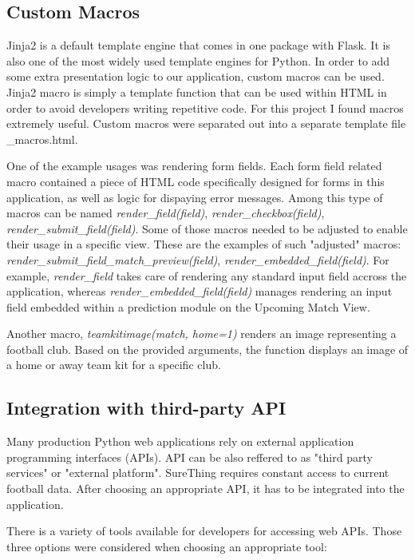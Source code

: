 \subsection{Custom Macros}
Jinja2 is a default template engine that comes in one package with Flask. It is also one of the most widely used template engines for Python. In order to add some extra presentation logic to our application, custom macros can be used. Jinja2 macro is simply a template function that can be used within HTML in order to avoid developers writing repetitive code. For this project I found macros extremely useful. Custom macros were separated out into a separate template file \_macros.html.

One of the example usages was rendering form fields. Each form field related macro contained a piece of HTML code specifically designed for forms in this application, as well as logic for dispaying error messages. Among this type of macros can be named \emph{render\_field(field)}, \emph{render\_checkbox(field)}, \emph{render\_submit\_field(field)}. Some of those macros needed to be adjusted to enable their usage in a specific view. These are the examples of such "adjusted" macros: \emph{render\_submit\_field\_match\_preview(field)}, \emph{render\_embedded\_field(field)}. For example, \emph{render\_field} takes care of rendering any standard input field accross the application, whereas \emph{render\_embedded\_field(field)} manages rendering an input field embedded within a prediction module on the Upcoming Match View. 

Another macro, \emph{teamkitimage(match, home=1)} renders an image representing a football club. Based on the provided arguments, the function displays an image of a home or away team kit for a specific club. 

\subsection{Integration with third-party API}
Many production Python web applications rely on external application programming interfaces (APIs). API can be also reffered to as "third party services" or "external platform".\cite{apiintegration}  SureThing requires constant access to current football data. After choosing an appropriate API, it has to be integrated into the application. 

There is a variety of tools available for developers for accessing web APIs. Those three options were considered when choosing an appropriate tool:
	
